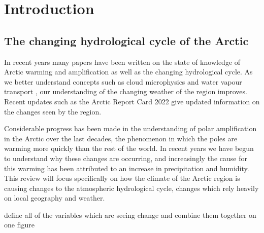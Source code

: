 \documentclass[12pt, oneside]{article}
\begin{document}
\thispagestyle{empty}
\clearpage
\setcounter{page}{1}


\pagebreak







\section{Introduction}
\subsection{The changing hydrological cycle of the Arctic}
In recent years many papers have been written on the state of knowledge of Arctic warming and amplification \cite{davy2018arctic, previdi2021arctic, vihma2016atmospheric, serreze2011processes} as well as the changing hydrological cycle. As we better understand concepts such as cloud microphysics \cite{pithan2014mixed} and water vapour transport \cite{gimeno2019atmospheric}, our understanding of the changing weather of the region improves. Recent updates such as the Arctic Report Card 2022 \cite{druckenmiller2022arctic} give updated information on the changes seen by the region.


Considerable progress has been made in the understanding of polar amplification in the Arctic over the last decades, the phenomenon in which the poles are warming more quickly than the rest of the world. In recent years we have begun to understand why these changes are occurring, and increasingly the cause for this warming has been attributed to an increase in precipitation and humidity. This review will focus specifically on how the climate of the Arctic region is causing changes to the atmospheric hydrological cycle, changes which rely heavily on local geography and weather. 


define all of the variables which are seeing change and combine them together on one figure
\end{document}
